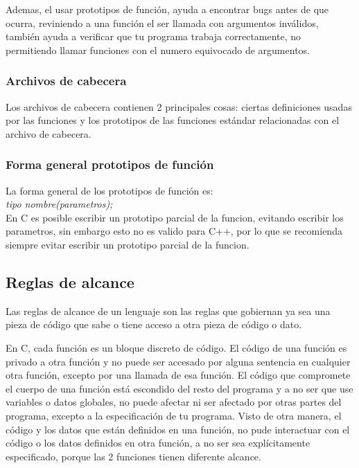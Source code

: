 \documentclass[]{article}
\begin{document}
	Ademas, el usar prototipos de función, ayuda a encontrar bugs antes de que ocurra, reviniendo a una función el ser llamada con argumentos inválidos, también ayuda a verificar que tu programa trabaja correctamente, no permitiendo llamar funciones con el numero equivocado de argumentos.\\
	
	\subsubsection{Archivos de cabecera }
	
	Los archivos de cabecera contienen 2 principales cosas: ciertas definiciones usadas por las funciones y los prototipos de las funciones estándar relacionadas con el archivo de cabecera.
	
	\subsubsection{Forma general prototipos de función}
	
	La forma general de los prototipos de función es:\\
	
	\textit{tipo nombre(parametros);}\\
	
	En C es posible escribir un prototipo parcial de la funcion, evitando escribir los parametros, sin embargo esto no es valido para C++, por lo que se recomienda siempre evitar escribir un prototipo parcial de la funcion.
	
	\subsection{Reglas de alcance}
	
	Las reglas de alcance de un lenguaje son las reglas que gobiernan ya sea una pieza de código que sabe o tiene acceso a otra pieza de código o dato.
	
	En C, cada función es un bloque discreto de código. El código de una función es privado a otra función y no puede ser accesado por alguna sentencia en cualquier otra función, excepto por una llamada de esa función. El código que compromete el cuerpo de una función está escondido del resto del programa y a no ser que use variables o datos globales, no puede afectar ni ser afectado por otras partes del programa, excepto a la especificación de tu programa. Visto de otra manera, el código y los datos que están definidos en una función, no pude interactuar con el código o los datos definidos en otra función, a no ser sea explícitamente especificado, porque las 2 funciones tienen diferente alcance.
	
\end{document}
